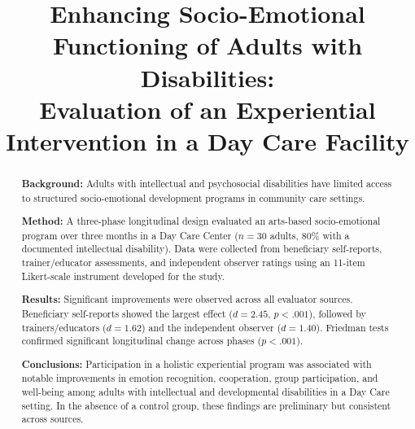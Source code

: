 \documentclass[12pt,a4paper]{article}
\title{Enhancing Socio-Emotional Functioning of Adults with Disabilities:\\
Evaluation of an Experiential Intervention in a Day Care Facility}
\date{}
\begin{document}
\maketitle

\begin{abstract}
\noindent\textbf{Background:} Adults with intellectual and psychosocial disabilities have limited access to structured socio-emotional development programs in community care settings.

\noindent\textbf{Method:} A three-phase longitudinal design evaluated an arts-based socio-emotional program over three months in a Day Care Center ($n = 30$ adults, 80\% with a documented intellectual disability). Data were collected from beneficiary self-reports, trainer/educator assessments, and independent observer ratings using an 11-item Likert-scale instrument developed for the study.

\noindent\textbf{Results:} Significant improvements were observed across all evaluator sources. Beneficiary self-reports showed the largest effect ($d = 2.45$, $p < .001$), followed by trainers/educators ($d = 1.62$) and the independent observer ($d = 1.40$). Friedman tests confirmed significant longitudinal change across phases ($p < .001$).

\noindent\textbf{Conclusions:} Participation in a holistic experiential program was associated with notable improvements in emotion recognition, cooperation, group participation, and well-being among adults with intellectual and developmental disabilities in a Day Care setting. In the absence of a control group, these findings are preliminary but consistent across sources.
\end{abstract}

\end{document}
